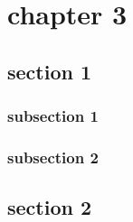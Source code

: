 \chapter{chapter 3}
\section{section 1}
\subsection{subsection 1}
\subsection{subsection 2}
\section{section 2}